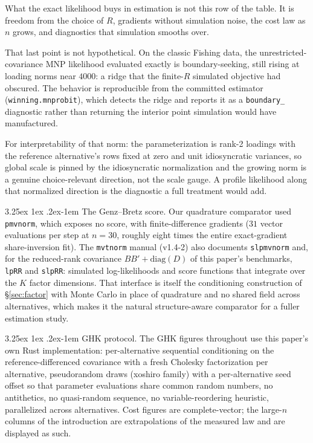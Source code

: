 \documentclass[11pt]{article}
\makeatletter
\renewcommand\paragraph{\@startsection{paragraph}{4}{\z@}%
  {3.25ex \@plus1ex \@minus.2ex}{-1em}%
  {\normalfont\normalsize\itshape}}
\makeatother
\begin{document}
What the exact likelihood buys in estimation is not this row of the
table. It is freedom from the choice of $R$, gradients without simulation
noise, the cost law as $n$ grows, and diagnostics that simulation smooths
over.

That last point is not hypothetical. On the classic Fishing data, the
unrestricted-covariance MNP likelihood evaluated exactly is
boundary-seeking, still rising at loading norms near $4000$: a ridge
that the finite-$R$ simulated objective had obscured. The behavior is
reproducible from the committed estimator (\texttt{winning.mnprobit}),
which detects the ridge and reports it as a \texttt{boundary\_}
diagnostic rather than returning the interior point simulation would have
manufactured.

For interpretability of that norm: the parameterization is rank-2
loadings with the reference alternative's rows fixed at zero and unit
idiosyncratic variances, so global scale is pinned by the idiosyncratic
normalization and the growing norm is a genuine choice-relevant
direction, not the scale gauge. A profile likelihood along that
normalized direction is the diagnostic a full treatment would add.

\paragraph{The Genz--Bretz score.} Our quadrature comparator used
\texttt{pmvnorm}, which exposes no score, with finite-difference gradients
($31$ vector evaluations per step at $n=30$, roughly eight times the entire
exact-gradient share-inversion fit). The \texttt{mvtnorm} manual (v1.4-2)
also documents \texttt{slpmvnorm} and, for the reduced-rank covariance
$BB'+\mathrm{diag}(D)$ of this paper's benchmarks, \texttt{lpRR} and
\texttt{slpRR}: simulated log-likelihoods and score functions that
integrate over the $K$ factor dimensions. That interface is itself the
conditioning construction of \S\ref{sec:factor} with Monte Carlo in place
of quadrature and no shared field across alternatives, which makes it the
natural structure-aware comparator for a fuller estimation study.

\paragraph{GHK protocol.} The GHK figures throughout use this paper's own
Rust implementation: per-alternative sequential conditioning on the
reference-differenced covariance with a fresh Cholesky factorization per
alternative, pseudorandom draws (xoshiro family) with a per-alternative
seed offset so that parameter evaluations share common random numbers, no
antithetics, no quasi-random sequence, no variable-reordering heuristic,
parallelized across alternatives. Cost figures are complete-vector; the
large-$n$ columns of the introduction are extrapolations of the measured
law and are displayed as such.
\end{document}
